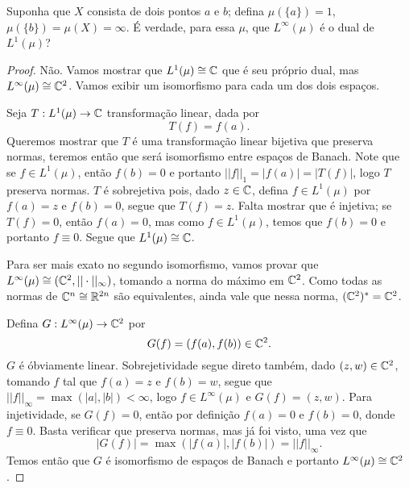 \begin{problem}
    \label{prob:l7:3}
    Suponha que $X$ consista de dois pontos $a$ e $b$; defina $\mu(\{a\}) = 1$, $\mu(\{b\}) = \mu(X) = \infty$. É verdade,
    para essa $\mu$, que $L^\infty(\mu)$ é o dual de $L^1(\mu)$?
\end{problem}
\begin{proof}
    Não. Vamos mostrar que $L^1(\mu) \cong \mathbb{C}$ que é seu próprio dual, mas $L^\infty(\mu) \cong \mathbb{C}^2$.
    Vamos exibir um isomorfismo para cada um dos dois espaços.

    Seja $T: L^1(\mu) \rightarrow \mathbb{C}$ transformação linear, dada por 
    $$T(f) = f(a).$$
    Queremos mostrar que $T$ é uma transformação linear bijetiva que preserva normas, teremos então que será isomorfismo entre espaços 
    de Banach.
    Note que se $f \in L^1(\mu)$, então $f(b) = 0$ e portanto $||f||_1 = |f(a)| = |T(f)|$, logo $T$ preserva normas.
    $T$ é sobrejetiva pois, dado $z \in \mathbb{C}$, defina $f \in L^1(\mu)$ por $f(a) = z$ e $f(b) = 0$, segue que $T(f) = z$.
    Falta mostrar que é injetiva; se $T(f) = 0$, então $f(a) = 0$, mas como $f \in L^1(\mu)$, temos que $f(b) = 0$ e portanto 
    $f \equiv 0$. Segue que $L^1(\mu) \cong \mathbb{C}$.
    
    Para ser mais exato no segundo isomorfismo, vamos provar que $L^\infty(\mu) \cong (\mathbb{C}^2, ||\cdot||_\infty)$, tomando a norma do máximo 
    em $\mathbb{C}^2$. Como todas as normas de $\mathbb{C}^n \cong \mathbb{R}^{2n}$ são equivalentes, ainda vale que nessa norma, $(\mathbb{C}^2)^* = \mathbb{C}^2$. 
    
    Defina $G : L^\infty(\mu) \rightarrow \mathbb{C}^2$ por
    $$G(f) = (f(a),f(b)) \in \mathbb{C}^2.$$
    $G$ é óbviamente linear. Sobrejetividade segue direto também, dado $(z,w) \in \mathbb{C}^2$, tomando $f$ tal que
    $f(a) = z$ e $f(b) = w$, segue que $||f||_\infty = \max(|a|,|b|) < \infty$, logo $f \in L^\infty(\mu)$ e $G(f) = (z,w)$. 
    Para injetividade, se $G(f) = 0$, então por definição $f(a) = 0$ e $f(b) = 0$, donde $f \equiv 0$. Basta verificar que preserva normas,
    mas já foi visto, uma vez que
    $$|G(f)| = \max(|f(a)|, |f(b)|) = ||f||_\infty.$$
    Temos então que $G$ é isomorfismo de espaços de Banach e portanto $L^\infty(\mu) \cong \mathbb{C}^2$.

\end{proof}

